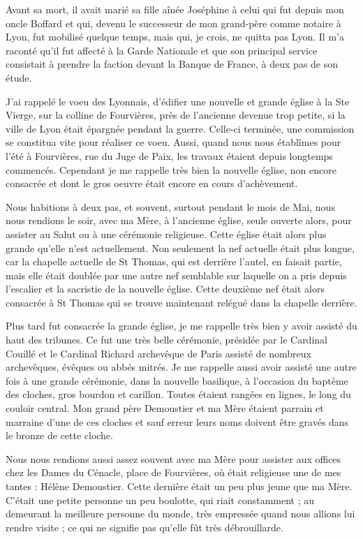 \documentclass[11pt,a4paper]{report}
\begin{document}
Avant sa mort, il avait marié sa fille aînée Joséphine à celui qui fut depuis mon oncle Boffard et qui, devenu le successeur de mon grand-père comme notaire à Lyon, fut mobilisé quelque temps, mais qui, je crois, ne quitta pas Lyon. Il m'a raconté qu'il fut affecté à la Garde Nationale et que son principal service consistait à prendre la faction devant la Banque de France, à deux pas de son étude.

J'ai rappelé le voeu des Lyonnais, d'édifier une nouvelle et grande église à la Ste Vierge, sur la colline de Fourvières, près de l'ancienne devenue trop petite, si la ville de Lyon était épargnée pendant la guerre. Celle-ci terminée, une commission se constitua vite pour réaliser ce voeu. Aussi, quand nous nous établîmes pour l'été à Fourvières, rue du Juge de Paix, les travaux étaient depuis longtemps commencés. Cependant je me rappelle très bien la nouvelle église, non encore consacrée et dont le gros oeuvre était encore en cours d'achèvement.

Nous habitions à deux pas, et souvent, surtout pendant le mois de Mai, nous nous rendions le soir, avec ma Mère, à l'ancienne église, seule ouverte alors, pour assister au Salut ou à une cérémonie religieuse. Cette église était alors plus grande qu'elle n'est actuellement. Non seulement la nef actuelle était plus longue, car la chapelle actuelle de St Thomas, qui est derrière l'autel, en faisait partie, mais elle était doublée par une autre nef semblable sur laquelle on a pris depuis l'escalier et la sacristie de la nouvelle église. Cette deuxième nef était alors consacrée à St Thomas qui se trouve maintenant relégué dans la chapelle derrière.

Plus tard fut consacrée la grande église, je me rappelle très bien y avoir assisté du haut des tribunes. Ce fut une très belle cérémonie, présidée par le Cardinal Couillé et le Cardinal Richard archevêque de Paris assisté de nombreux archevêques, évêques ou abbés mitrés. Je me rappelle aussi avoir assisté une autre fois à une grande cérémonie, dans la nouvelle basilique, à l'occasion du baptême des cloches, gros bourdon et carillon. Toutes étaient rangées en lignes, le long du couloir central. Mon grand père Demoustier et ma Mère étaient parrain et marraine d'une de ces cloches et sauf erreur leurs noms doivent être gravés dans le bronze de cette cloche.

Nous nous rendions aussi assez souvent avec ma Mère pour assister aux offices chez les Dames du Cénacle, place de Fourvières, où était religieuse une de mes tantes : Hélène Demoustier. Cette dernière était un peu plus jeune que ma Mère. C'était une petite personne un peu boulotte, qui riait constamment ; au demeurant la meilleure personne du monde, très empressée quand nous allions lui rendre visite ; ce qui ne signifie pas qu'elle fût très débrouillarde.
\end{document}
